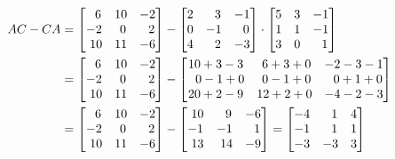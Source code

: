 \documentclass[12pt]{amsart}
\begin{document}
\begin{enumerate}
		\begin{align}
			\hspace{0.9cm} AC-CA&=
			\begin{bmatrix}
				\text{ } \text{ }6 &10 &-2 \\
				-2 &\text{ }0 &\text{ } \text{ }2 \\
				\text{ }10 &11 &-6
			\end{bmatrix} -
			\begin{bmatrix}
				2 &\text{ } \text{ }3 &-1 \\
				0 &-1 &\text{ } \text{ }0 \\
				4 &\text{ } \text{ }2 &-3
			\end{bmatrix} \cdot
			\begin{bmatrix}
				5 &3 &-1 \\
				1 &1 &-1 \\
				3 &0 & \text{ } \text{ } 1
			\end{bmatrix} \notag \\
			&=
			\begin{bmatrix}
				\text{ } \text{ }6 &10 &-2 \\
				-2 &\text{ }0 &\text{ } \text{ }2 \\
				\text{ }10 &11 &-6
			\end{bmatrix} -
			\begin{bmatrix}
				10+3-3 &\text{ }6+3+0 &-2-3-1 \\
				\text{ } \text{ }0-1+0 &\text{ }0-1+0 &\text{ } \text{ }0+1+0 \\
				20+2-9 &12+2+0 &-4-2-3
			\end{bmatrix} \notag \\
			&=
			\begin{bmatrix}
				\text{ } \text{ }6 &10 &-2 \\
				-2 &\text{ }0 &\text{ } \text{ }2 \\
				\text{ }10 &11 &-6
			\end{bmatrix} -
			\begin{bmatrix}
				\text{ }10 &\text{ } \text{ }9 &-6 \\
				-1 &-1 &\text{ } \text{ }1 \\
				\text{ }13 &\text{ }14 &-9
			\end{bmatrix} =
			\begin{bmatrix}
				-4 &\text{ } \text{ }1 &4 \\
				-1 &\text{ } \text{ }1 &1 \\
				-3 &-3 & 3 
			\end{bmatrix} \notag
		\end{align}
		

\end{enumerate}
\end{document}
